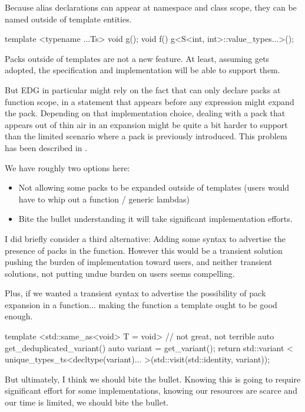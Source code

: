 \documentclass{wg21}
\begin{document}
Because alias declarations can appear at namespace and class scope, they can be named outside of template entities.

\begin{colorblock}
template <typename ...Ts>
void g();
void f() {
    g<S<int, int>::value_types...>();
}
\end{colorblock}


Packs outside of templates are not a new feature. At least, assuming  gets adopted, the specification
and implementation will be able to support them.

But EDG in particular might rely on the fact that  can only declare packs at function scope, in a statement that appears
before any expression might expand the pack.
Depending on that implementation choice, dealing with a pack that appears out of thin air in an expansion might be quite a bit harder to
support than the limited scenario where a pack is previously introduced.
This problem has been described in .

We have roughly two options here:

\begin{itemize}
\item Not allowing some packs to be expanded outside of templates (users would have to whip out a function / generic lambdas)
\item Bite the bullet understanding it will take significant implementation efforts.
\end{itemize}

I did briefly consider a third alternative: Adding some syntax to advertise the presence of packs in the function.
However this would be a transient solution pushing the burden of implementation toward users, and neither transient solutions,
not putting undue burden on users seems compelling.

Plus, if we wanted a transient syntax to advertise the possibility of pack expansion in a function... making the function a template ought to be good enough.

\begin{colorblock}
template <std::same_as<void> T = void> // not great, not terrible
auto get_deduplicated_variant()  {
    auto variant = get_variant();
    return std::variant <
        unique_types_ts<decltype(variant)...
    >(std::visit(std::identity{}, variant));
}
\end{colorblock}


But ultimately, I think we should bite the bullet.
Knowing this is going to require significant effort for some implementations, knowing our resources are scarce and our time is limited, we should bite the bullet.
\end{document}
